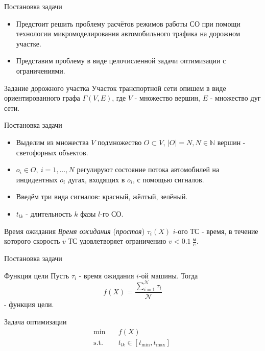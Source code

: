 \documentclass[aspectratio=169]{beamer}
\begin{document}
	\begin{frame}{Постановка задачи}
		\begin{itemize}
			\item Предстоит решить проблему расчётов режимов работы СО при помощи технологии микромоделирования автомобильного трафика на дорожном участке.
			\item Представим проблему в виде целочисленной задачи оптимизации с ограничениями.
		\end{itemize}
		
		\begin{block}{Задание дорожного участка}
			Участок транспортной сети опишем в виде ориентированного графа $\Gamma(V,E)$, где $V$ - множество вершин, $E$ - множество дуг сети.\\
		\end{block}
		
	\end{frame}

	\begin{frame}{Постановка задачи}
		\begin{itemize}
			\item Выделим из множества $V$ подмножество $O \subset V$, $|O| = N, N \in \mathbb{N}$ вершин - светофорных объектов.
			\item $o_i\in O, \ i = 1,\ldots, N$ регулируют состояние потока автомобилей на инцидентных $o_i$ дугах, входящих в $o_i$, с помощью сигналов.
			\item Введём три вида сигналов: красный, жёлтый, зелёный.
			\item $t_{lk}$ - длительность $k$ фазы $l$-го СО.
		\end{itemize}	
		\begin{block}{Время ожидания}
			\textit{Время ожидания} (\textit{простоя}) $\tau_i(X)$ $i$-ого ТС - время, в течение которого скорость $v$ ТС удовлетворяет ограничению $v < 0.1 \ \frac{\text{м}}{\text{c}}$.
		\end{block}
	\end{frame}
	
	\begin{frame}{Постановка задачи}
		\begin{block}{Функция цели}
			Пусть $\tau_i$ - время ожидания $i$-ой машины. Тогда
			\begin{equation}
				\displaystyle f(X) = \frac{\sum\limits_{i = 1}^{\mathcal{N}}\tau_i}{\mathcal{N}}
			\end{equation} - функция цели.\\
		\end{block}
		\begin{block}{Задача оптимизации}
			\begin{equation}
				\label{eq:goal-function}
				\begin{aligned}
					\min \quad & f(X) \\
					\text{s.t.} \quad & t_{lk} \in [t_{\min}, t_{\max}]\
				\end{aligned}	
			\end{equation}
		\end{block}
	\end{frame}
	
\end{document}
